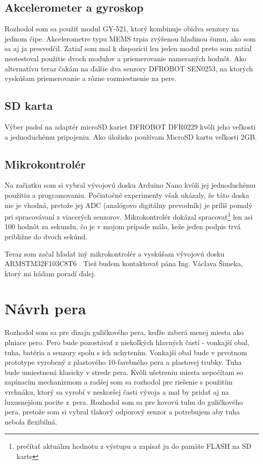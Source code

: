 \subsection*{Akcelerometer a gyroskop}

Rozhodol som sa použiť modul GY-521, ktorý kombinuje obidva senzory na jednom čipe. Akcelerometre typu MEMS trpia zvýšenou hladinou šumu\cite{PawlusJan2019Zpns}, ako som sa aj ja presvedčil. Zatiaľ som mal k dispozícii len jeden modul preto som zatiaľ neotestoval použitie dvoch modulov a priemerovanie nameraných hodnôt. Ako alternatívu teraz čakám na ďalšie dva senzory DFROBOT SEN0253\cite{PohybovySenzor}, na ktorých vyskúšam priemerovanie a rôzne rozmiestnenie na pere.

\subsection*{SD karta}

Výber padol na adaptér microSD kariet DFROBOT DFR0229 kvôli jeho veľkosti a jednoduchému pripojeniu. Ako úložisko používam MicroSD kartu veľkosti 2GB. 

\subsection*{Mikrokontrolér}

Na začiatku som si vybral vývojovú dosku Arduino Nano kvôli jej jednoduchému použitiu a programovaniu. 
Počiatočné experimenty však ukázaly, že táto doska nie je vhodná, pretože jej ADC (analógovo digitálny prevodník) je príliš pomalý pri spracovávaní z viacerých senzorov. Mikrokontrolér dokázal spracovať\footnote{prečítať aktuálnu hodnotu z výstupu a zapísať ju do pamäte FLASH na SD karte} len asi 100 hodnôt za sekundu, čo je v mojom prípade málo, keže jeden podpis trvá približne do dvoch sekúnd.

Teraz som začal hľadať iný mikrokontrolér a vyskúšam vývojovú dosku ARMSTM32F103C8T6 \cite{ArduinoARM}. Tiež budem kontaktovať pána Ing. Václava Šimeka, ktorý mi hádam poradí ďalej.


\section{Návrh pera}

Rozhodol som sa pre dizajn guličkového pera, keďže zaberá menej miesta ako plniace pero. Pero bude pozostávať z niekoľkých hlavných častí - vonkajší obal, tuha, batéria a senzory spolu s ich uchytením. Vonkajší obal bude v prvotnom prototype vyrobený z plastového 10-farebného pera a plastovej trubky. Tuha bude umiestnená klasicky v strede pera. Kvôli ušetreniu miesta nepočítam so zapínacím mechanizmom a radšej som sa rozhodol pre riešenie s použitím vrchnáku, ktorý sa vyrobí v neskoršej časti vývoja a mal by pridať aj na luxusnejšom pocite z~pera. Rozhodol som sa pre kovovú tuhu do guličkového pera, pretože som si vybral tlakový odporový senzor a potrebujem aby tuha nebola flexibilná. 

